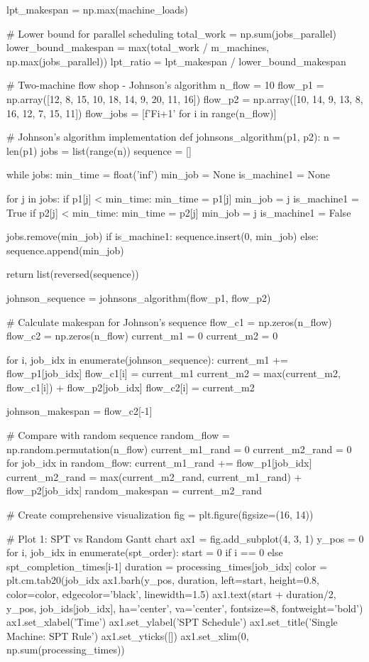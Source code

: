 \documentclass[a4paper, 11pt]{article}
\begin{document}
\begin{pycode}
lpt_makespan = np.max(machine_loads)

# Lower bound for parallel scheduling
total_work = np.sum(jobs_parallel)
lower_bound_makespan = max(total_work / m_machines, np.max(jobs_parallel))
lpt_ratio = lpt_makespan / lower_bound_makespan

# Two-machine flow shop - Johnson's algorithm
n_flow = 10
flow_p1 = np.array([12, 8, 15, 10, 18, 14, 9, 20, 11, 16])
flow_p2 = np.array([10, 14, 9, 13, 8, 16, 12, 7, 15, 11])
flow_jobs = [f'F{i+1}' for i in range(n_flow)]

# Johnson's algorithm implementation
def johnsons_algorithm(p1, p2):
    n = len(p1)
    jobs = list(range(n))
    sequence = []

    while jobs:
        min_time = float('inf')
        min_job = None
        is_machine1 = None

        for j in jobs:
            if p1[j] < min_time:
                min_time = p1[j]
                min_job = j
                is_machine1 = True
            if p2[j] < min_time:
                min_time = p2[j]
                min_job = j
                is_machine1 = False

        jobs.remove(min_job)
        if is_machine1:
            sequence.insert(0, min_job)
        else:
            sequence.append(min_job)

    return list(reversed(sequence))

johnson_sequence = johnsons_algorithm(flow_p1, flow_p2)

# Calculate makespan for Johnson's sequence
flow_c1 = np.zeros(n_flow)
flow_c2 = np.zeros(n_flow)
current_m1 = 0
current_m2 = 0

for i, job_idx in enumerate(johnson_sequence):
    current_m1 += flow_p1[job_idx]
    flow_c1[i] = current_m1
    current_m2 = max(current_m2, flow_c1[i]) + flow_p2[job_idx]
    flow_c2[i] = current_m2

johnson_makespan = flow_c2[-1]

# Compare with random sequence
random_flow = np.random.permutation(n_flow)
current_m1_rand = 0
current_m2_rand = 0
for job_idx in random_flow:
    current_m1_rand += flow_p1[job_idx]
    current_m2_rand = max(current_m2_rand, current_m1_rand) + flow_p2[job_idx]
random_makespan = current_m2_rand

# Create comprehensive visualization
fig = plt.figure(figsize=(16, 14))

# Plot 1: SPT vs Random Gantt chart
ax1 = fig.add_subplot(4, 3, 1)
y_pos = 0
for i, job_idx in enumerate(spt_order):
    start = 0 if i == 0 else spt_completion_times[i-1]
    duration = processing_times[job_idx]
    color = plt.cm.tab20(job_idx %
    ax1.barh(y_pos, duration, left=start, height=0.8, color=color, edgecolor='black', linewidth=1.5)
    ax1.text(start + duration/2, y_pos, job_ids[job_idx], ha='center', va='center', fontsize=8, fontweight='bold')
ax1.set_xlabel('Time')
ax1.set_ylabel('SPT Schedule')
ax1.set_title('Single Machine: SPT Rule')
ax1.set_yticks([])
ax1.set_xlim(0, np.sum(processing_times))


\end{pycode}
\end{document}
